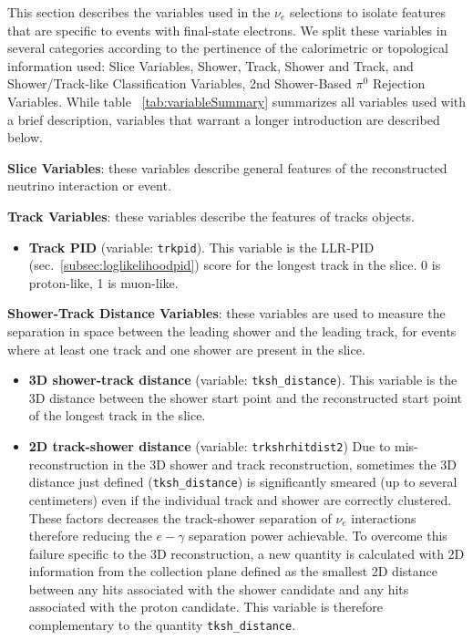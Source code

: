 \par This section describes the variables used in the $\nu_e$ selections to isolate features that are specific to events with final-state electrons. We split these variables in several categories according to the pertinence of the calorimetric or topological information used: Slice Variables, Shower, Track, Shower and Track, and Shower/Track-like  Classification Variables,  2nd Shower-Based $\pi^0$ Rejection Variables.  While table ~\ref{tab:variableSummary} summarizes all variables used with a brief description, variables that warrant a longer introduction are described below.

\par \noindent  \textbf{Slice Variables}: these variables describe general features of the reconstructed neutrino interaction or event.
\par \noindent  \textbf{Track Variables}: these variables describe the features of tracks objects.
\begin{itemize}
 \item[] \textbf{Track PID} (variable: \texttt{trkpid}).  This variable is the LLR-PID (sec.~\ref{subsec:loglikelihoodpid}) score for the longest track in the slice. 0 is proton-like, 1 is muon-like. 
 \end{itemize}
\par \noindent \textbf{Shower-Track Distance Variables}: these variables are used to measure the separation in space between the leading shower and the leading track, for events where at least one track and one shower are present in the slice. 
\begin{itemize}
 \item[] \textbf{3D shower-track distance} (variable: \texttt{tksh\_distance}).  This variable is the 3D distance between the shower start point and the reconstructed start point of the longest track in the slice. 
 \item[] \textbf{2D track-shower distance} (variable: \texttt{trkshrhitdist2}) Due to mis-reconstruction in the 3D shower and track reconstruction, sometimes the 3D distance just defined (\texttt{tksh\_distance}) is significantly smeared (up to several centimeters) even if the individual track and shower are correctly clustered. These factors decreases the track-shower separation of $\nu_e$ interactions therefore reducing the $e-\gamma$ separation power achievable. To overcome this failure specific to the 3D reconstruction, a new quantity is calculated with 2D information from the collection plane defined as the smallest 2D distance between any hits associated with the shower candidate and any hits associated with the proton candidate. This variable is therefore complementary to the quantity \texttt{tksh\_distance}.
\end{itemize}



